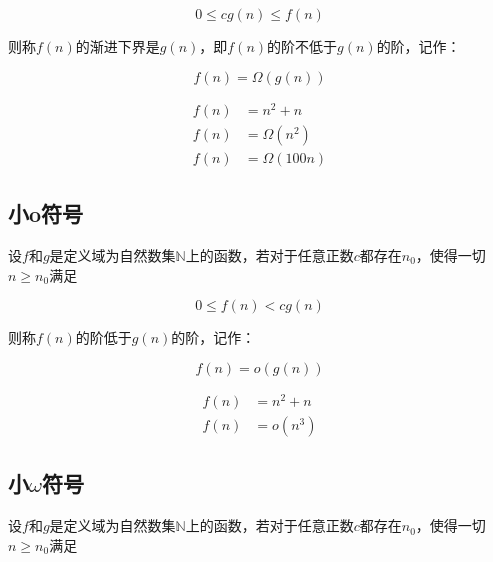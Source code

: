 \vspace{-0.5cm}

$$
    0 \le cg(n) \le f(n)
$$

则称$ f(n) $的渐进下界是$ g(n) $，即$ f(n) $的阶不低于$ g(n) $的阶，记作：

\vspace{-0.5cm}

$$
    f(n) = \Omega(g(n))
$$

\vspace{0.5cm}


\vspace{-0.5cm}

\begin{align*}
    f(n) & = n^2 + n      \\
    f(n) & = \Omega(n^2)  \\
    f(n) & = \Omega(100n)
\end{align*}

\subsection{小o符号}

设$ f $和$ g $是定义域为自然数集$ \mathbb{N} $上的函数，若对于任意正数$ c $都存在$ n_0 $，使得一切$ n \ge n_0 $满足

\vspace{-0.5cm}

$$
    0 \le f(n) < cg(n)
$$

则称$ f(n) $的阶低于$ g(n) $的阶，记作：

\vspace{-0.5cm}

$$
    f(n) = o(g(n))
$$

\vspace{0.5cm}


\vspace{-0.5cm}

\begin{align*}
    f(n) & = n^2 + n \\
    f(n) & = o(n^3)
\end{align*}

\subsection{小$ \omega $符号}

设$ f $和$ g $是定义域为自然数集$ \mathbb{N} $上的函数，若对于任意正数$ c $都存在$ n_0 $，使得一切$ n \ge n_0 $满足

